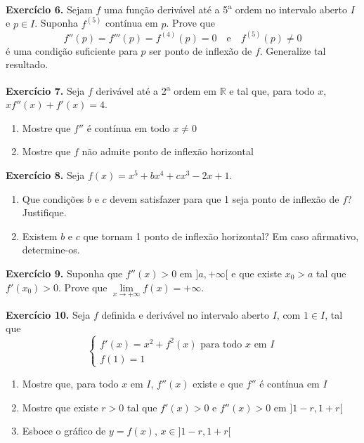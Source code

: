 \documentclass[12pt,a4paper]{article}
\begin{document}
\vspace{0.5cm}
\noindent\textbf{Exercício 6.} Sejam $f$ uma função derivável até a 5\textsuperscript{a} ordem no intervalo aberto $I$ e $p \in I$. Suponha $f^{(5)}$ contínua em $p$. Prove que
\[
f''(p) = f'''(p) = f^{(4)}(p) = 0 \quad\text{e}\quad f^{(5)}(p) \neq 0
\]
é uma condição suficiente para $p$ ser ponto de inflexão de $f$. Generalize tal resultado.

\vspace{0.5cm}
\noindent\textbf{Exercício 7.} Seja $f$ derivável até a 2\textsuperscript{a} ordem em $\mathbb{R}$ e tal que, para todo $x$, $xf''(x) + f'(x) = 4$.
\begin{enumerate}
    \renewcommand{\theenumi}{\alph{enumi}}
    \renewcommand{\labelenumi}{\theenumi)}
    \item Mostre que $f''$ é contínua em todo $x \neq 0$
    \item Mostre que $f$ não admite ponto de inflexão horizontal
\end{enumerate}

\vspace{0.5cm}
\noindent\textbf{Exercício 8.} Seja $f(x) = x^5 + bx^4 + cx^3 - 2x + 1$.
\begin{enumerate}
    \renewcommand{\theenumi}{\alph{enumi}}
    \renewcommand{\labelenumi}{\theenumi)}
    \item Que condições $b$ e $c$ devem satisfazer para que 1 seja ponto de inflexão de $f$? Justifique.
    \item Existem $b$ e $c$ que tornam 1 ponto de inflexão horizontal? Em caso afirmativo, determine-os.
\end{enumerate}

\vspace{0.5cm}
\noindent\textbf{Exercício 9.} Suponha que $f''(x) > 0$ em $]a, +\infty[$ e que existe $x_0 > a$ tal que $f'(x_0) > 0$. Prove que $\lim\limits_{x \to +\infty} f(x) = +\infty$.

\vspace{0.5cm}
\noindent\textbf{Exercício 10.} Seja $f$ definida e derivável no intervalo aberto $I$, com $1 \in I$, tal que
\[
\begin{cases}
f'(x) = x^2 + f^2(x) \text{ para todo } x \text{ em } I \\
f(1) = 1
\end{cases}
\]
\begin{enumerate}
    \renewcommand{\theenumi}{\alph{enumi}}
    \renewcommand{\labelenumi}{\theenumi)}
    \item Mostre que, para todo $x$ em $I$, $f''(x)$ existe e que $f''$ é contínua em $I$
    \item Mostre que existe $r > 0$ tal que $f'(x) > 0$ e $f''(x) > 0$ em $]1 - r, 1 + r[$
    \item Esboce o gráfico de $y = f(x)$, $x \in ]1 - r, 1 + r[$
\end{enumerate}
\end{document}
